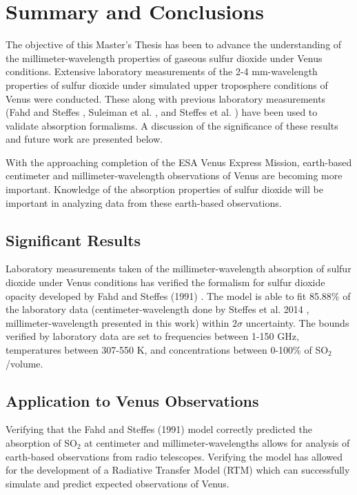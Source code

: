 \chapter{Summary and Conclusions}
The objective of this Master's Thesis has been to advance the understanding of the millimeter-wavelength properties of gaseous sulfur dioxide under Venus conditions. Extensive laboratory measurements of the 2-4 mm-wavelength properties of sulfur dioxide under simulated upper troposphere conditions of Venus were conducted. These along with previous laboratory measurements (Fahd and Steffes \cite{Fahd-1991}, Suleiman et al. \cite{Suleiman-1996}, and Steffes et al. \cite{Steffes-2014}) have been used to validate absorption formalisms. A discussion of the significance of these results and future work are presented below. 

With the approaching completion of the ESA Venus Express Mission, earth-based centimeter and millimeter-wavelength observations of Venus are becoming more important. Knowledge of the absorption properties of sulfur dioxide will be important in analyzing data from these earth-based observations. 
\section{Significant Results}

Laboratory measurements taken of the millimeter-wavelength absorption of sulfur dioxide under Venus conditions has verified the formalism for sulfur dioxide opacity developed by Fahd and Steffes (1991) \cite{Fahd-1991}. The model is able to fit 85.88\% of the laboratory data (centimeter-wavelength done by Steffes et al. 2014 \cite{Steffes-2014}, millimeter-wavelength presented in this work) within $2\sigma$ uncertainty. The bounds verified by laboratory data are set to frequencies between 1-150 GHz, temperatures between 307-550 K, and concentrations between 0-100\% of SO$_2$/volume. 
\section{Application to Venus Observations}
Verifying that the Fahd and Steffes (1991) \cite{Fahd-1991} model correctly predicted the absorption of SO$_2$ at centimeter and millimeter-wavelengths allows for analysis of earth-based observations from radio telescopes. Verifying the model has allowed for the development of a Radiative Transfer Model (RTM) which can successfully simulate and predict expected observations of Venus. 

